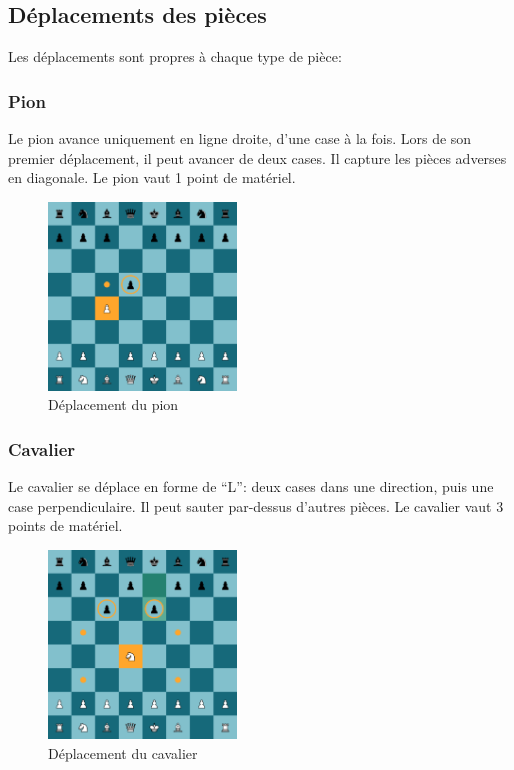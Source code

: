 \documentclass{article}
\begin{document}
\subsection{Déplacements des pièces}

Les déplacements sont propres à chaque type de pièce:

\subsubsection*{Pion}
Le pion avance uniquement en ligne droite, d'une case à la fois. Lors de son premier déplacement, il peut avancer de deux cases. Il capture les pièces adverses en diagonale. Le pion vaut 1 point de matériel.

\begin{figure}[h]
    \centering
    \includegraphics[width=\textwidth,height=5.0cm,keepaspectratio]{pionMove.png}
    \caption{Déplacement du pion}
\end{figure}

\subsubsection*{Cavalier}
Le cavalier se déplace en forme de ``L'': deux cases dans une direction, puis une case perpendiculaire. Il peut sauter par-dessus d'autres pièces.
Le cavalier vaut 3 points de matériel.

\begin{figure}[h]
    \centering
    \includegraphics[width=\textwidth,height=5.0cm,keepaspectratio]{cavalierMove.png}
    \caption{Déplacement du cavalier}
\end{figure}
\end{document}
